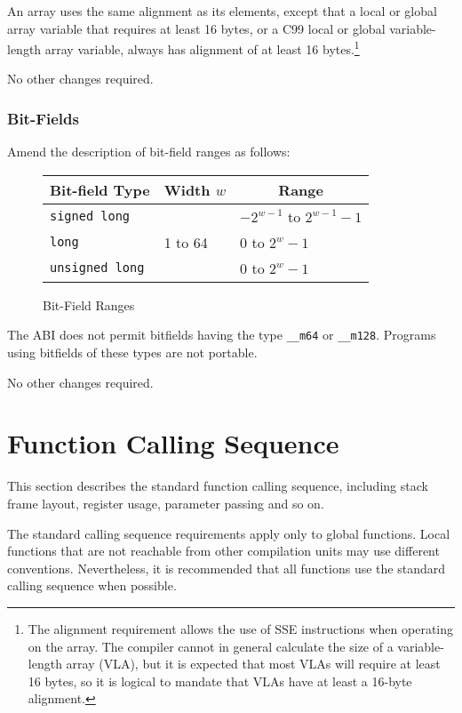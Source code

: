 An array uses the same alignment as its elements, except that a local
or global array variable that requires at least 16 bytes, or a C99
local or global variable-length array variable, always has alignment
of at least 16 bytes.\footnote{The alignment requirement allows the
  use of SSE instructions when operating on the array.  The compiler
  cannot in general calculate the size of a variable-length array (VLA), but
  it is expected that most VLAs will require at least 16 bytes, so it
  is logical to mandate that VLAs have at least a 16-byte alignment.}

No other changes required.

\subsubsection{Bit-Fields}

Amend the description of bit-field ranges as follows:

\begin{figure}[h]
\Hrule
  \caption{Bit-Field Ranges}
  \begin{center}
    \leavevmode
    \begin{tabular}{l|l|l}
      \multicolumn{1}{c}{Bit-field Type}
         & \multicolumn{1}{c}{Width $w$}
         & \multicolumn{1}{c}{Range} \\
      \hline
      \texttt{signed long} & & $-2^{w - 1}$ to $2^{w-1}-1$ \\
      \texttt{long} & 1 to 64 & 0 to $2^{w}-1$ \\
      \texttt{unsigned long} & & 0 to $2^{w}-1$ \\
    \end{tabular}
  \end{center}
\Hrule
\end{figure}

The ABI does not permit bitfields having the type \texttt{__m64} or
\texttt{__m128}.  Programs using bitfields of these types are not
portable.

No other changes required.

\section{Function Calling Sequence}

This section describes the standard function calling sequence,
including stack frame layout, register usage, parameter passing and so
on.

The standard calling sequence requirements apply only to global
functions.  Local functions that are not reachable from other
compilation units may use different conventions.  Nevertheless, it is
recommended that all functions use the standard calling sequence when
possible.


